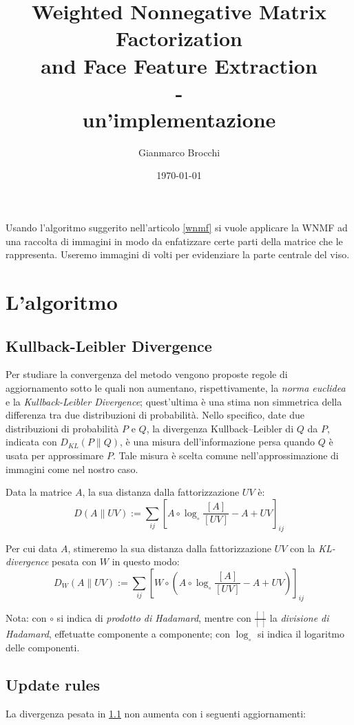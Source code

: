 \documentclass[a4paper]{article} %
\author{Gianmarco Brocchi}
\title{Weighted Nonnegative Matrix Factorization \\
and Face Feature Extraction \\ - \\ un'implementazione}
\date{\today}
\begin{document}
\maketitle

Usando l'algoritmo suggerito nell'articolo \ref{wnmf} si vuole applicare la WNMF ad una raccolta di immagini in modo da enfatizzare certe parti della matrice che le rappresenta. Useremo immagini di volti per evidenziare la parte centrale del viso.

\section{L'algoritmo}

\subsection{Kullback-Leibler Divergence}\label{KL-div}
Per studiare la convergenza del metodo vengono proposte regole di aggiornamento sotto le quali non aumentano, rispettivamente, la \emph{norma euclidea} e la \emph{Kullback-Leibler Divergence}; quest'ultima è una stima non simmetrica della differenza tra due distribuzioni di probabilità. Nello specifico, date due distribuzioni di probabilità $P$ e $Q$, la divergenza Kullback–Leibler di $Q$ da $P$, indicata con $D_{KL}(P \lVert Q)$, è una misura dell'informazione persa quando $Q$ è usata per approssimare $P$. Tale misura è scelta comune nell'approssimazione di immagini come nel nostro caso.

Data la matrice $A$, la sua distanza dalla fattorizzazione $UV$ è:
\[ D(A \lVert UV) := \sum_{ij} \left[ A \circ \log_{\circ} \frac{[A]}{[UV]} - A + UV \right]_{ij} \]

Per cui data $A$, stimeremo la sua distanza dalla fattorizzazione $UV$ con la \emph{KL-divergence} pesata con $W$ in questo modo:
\[ D_W(A \lVert UV) := \sum_{ij} \left[ W \circ \left( A \circ \log_{\circ} \frac{[A]}{[UV]} - A + UV \right) \right]_{ij} \]

Nota: con $\circ$ si indica di \emph{prodotto di Hadamard}, mentre con $\frac{[\;]}{[\;]}$ la \emph{divisione di Hadamard}, effetuatte componente a componente; con $\log_{\circ}$ si indica il logaritmo delle componenti.

\subsection{Update rules}\label{updaterules}
La divergenza pesata in \ref{KL-div} non aumenta con i seguenti aggiornamenti:
\end{document}
